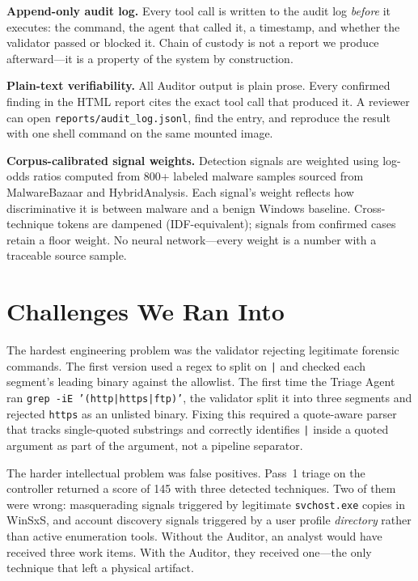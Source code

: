 \documentclass[10pt, letterpaper]{article}
\begin{document}
\textbf{Append-only audit log.} Every tool call is written to the audit
log \emph{before} it executes: the command, the agent that called it,
a timestamp, and whether the validator passed or blocked it. Chain of
custody is not a report we produce afterward---it is a property of the
system by construction.

\textbf{Plain-text verifiability.} All Auditor output is plain prose.
Every confirmed finding in the HTML report cites the exact tool call
that produced it. A reviewer can open \texttt{reports/audit\_log.jsonl},
find the entry, and reproduce the result with one shell command on the
same mounted image.

\textbf{Corpus-calibrated signal weights.} Detection signals are weighted
using log-odds ratios computed from 800+ labeled malware samples sourced
from MalwareBazaar and HybridAnalysis. Each signal's weight reflects
how discriminative it is between malware and a benign Windows baseline.
Cross-technique tokens are dampened (IDF-equivalent); signals from confirmed
cases retain a floor weight. No neural network---every weight is a number
with a traceable source sample.

\section{Challenges We Ran Into}

The hardest engineering problem was the validator rejecting legitimate
forensic commands. The first version used a regex to split on \texttt{|}
and checked each segment's leading binary against the allowlist. The
first time the Triage Agent ran \texttt{grep -iE '(http|https|ftp)'},
the validator split it into three segments and rejected \texttt{https}
as an unlisted binary. Fixing this required a quote-aware parser that
tracks single-quoted substrings and correctly identifies \texttt{|} inside
a quoted argument as part of the argument, not a pipeline separator.

The harder intellectual problem was false positives. Pass~1 triage on the
controller returned a score of 145 with three detected techniques.
Two of them were wrong: masquerading signals triggered by legitimate
\texttt{svchost.exe} copies in WinSxS, and account discovery signals
triggered by a user profile \emph{directory} rather than active
enumeration tools. Without the Auditor, an analyst would have received
three work items. With the Auditor, they received one---the only technique
that left a physical artifact.
\end{document}
